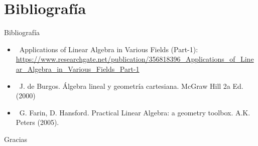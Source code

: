 \documentclass[xcolor={dvipsnames},aspectratio=169,10pt]{beamer}
\begin{document}
\section{Bibliografía}

\begin{frame}{Bibliografía}
  \begin{itemize}
    \item \faGlobe\, Applications of Linear Algebra in Various Fields (Part-1): \url{https://www.researchgate.net/publication/356818396_Applications_of_Linear_Algebra_in_Various_Fields_Part-1}
    \item \faBook\, J. de Burgos. Álgebra lineal y geometría cartesiana. McGraw Hill 2a Ed. (2000)
    \item \faBook\, G. Farin, D. Hansford. Practical Linear Algebra: a geometry toolbox. A.K. Peters (2005).
  \end{itemize}
\end{frame}

\begin{frame}[standout]
  Gracias \\
\end{frame}
\end{document}
